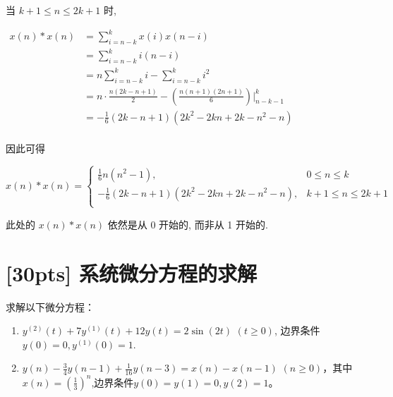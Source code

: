 \documentclass[a4paper,UTF8]{article}
\numberwithin{equation}{section}
\begin{document}
\begin{framed}
\begin{spacing}{1.5}
\begin{itemize}
      当 $k+1 \le n \le 2k+1$ 时,
      
      $
      \begin{aligned}
      x(n) * x(n) & = \sum_{i=n-k}^{k}x(i)x(n-i)  \\
      & = \sum_{i=n-k}^{k}i(n-i)  \\
      & = n\sum_{i=n-k}^{k}i-\sum_{i=n-k}^{k}i^{2}  \\
      & = n\cdot \frac{n (2 k - n + 1)}{2}-(\frac{n(n+1)(2n+1)}{6})|_{n-k-1}^{k}  \\
      & = - \frac{1}{6}(2 k - n + 1) (2 k^{2} - 2 k n + 2 k - n^{2} - n) \\
      \end{aligned}
      $
      
      因此可得
      
      $x(n) * x(n) = \begin{cases}
          \frac{1}{6}n (n^{2} - 1), & 0 \le n \le k \\
          - \frac{1}{6}(2 k - n + 1) (2 k^{2} - 2 k n + 2 k - n^{2} - n), & k+1 \le n \le 2k+1 \\
      \end{cases}$
      
      此处的 $x(n) * x(n)$ 依然是从 0 开始的, 而非从 1 开始的.
    \end{itemize}
\end{spacing}
\end{framed}


\newpage
\section{[30pts] 系统微分方程的求解 }
求解以下微分方程：
\begin{enumerate}[(1)]
	\item $y^{(2)}(t)+7y^{(1)}(t)+12y(t)=2\sin(2t)$ $(t\geqslant0)$, 边界条件$y(0)=0,y^{(1)}(0)=1$.
	\item $y(n)-\displaystyle\frac{3}{4}y(n-1)+\frac{1}{16}y(n-3)=x(n)-x(n-1)$ $(n\geqslant0)$，其中$x(n)=\displaystyle\left(\frac{1}{3}\right)^n$,边界条件$y(0)=y(1)=0,y(2)=1$。
\end{enumerate}
\end{document}
